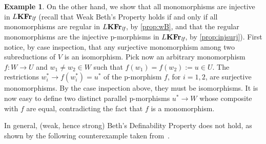 \documentclass{article}
\theoremstyle{definition}
\newtheorem{example}{Example}
\newcommand{\KFr}{\textup{\textbf{KFr}}}
\newcommand{\lf}{\textit{lf}}
\begin{document}
\begin{example}
 On the other hand, we show that all monomorphisms are injective in $L\KFr_\lf$ (recall that Weak Beth's Property holds if and only if all monomorphisms are regular in $L\KFr_\lf$, by \cref{prop:wB}, and that the regular monomorphisms are the injective p-morphisms in $L\KFr_\lf$, by \cref{prop:injsurj}). First notice, by case inspection, that any
 surjective
 monomorphism among two subreductions of $V$
 is an isomorphism. Pick now an arbitrary monomorphism $f: W\longrightarrow U$ and $w_1\neq w_2\in W$ such that $f(w_1)=f(w_2):=u \in U$.
 The restrictions $w_i^* \longrightarrow f(w^*_i) = u^*$ of the p-morphism $f$, for $i = 1,2$, are surjective monomorphisms. By the case inspection above, they must be isomorphisms.
 It is now easy to define two distinct parallel p-morphisms $u^* \longrightarrow W$ whose composite with $f$ are equal, contradicting the fact that $f$ is a monomorphism.
\end{example}

In general, (weak, hence strong) Beth's Definability Property does not hold, as shown by the following counterexample taken from~\cite{Copr}. 
\end{document}
